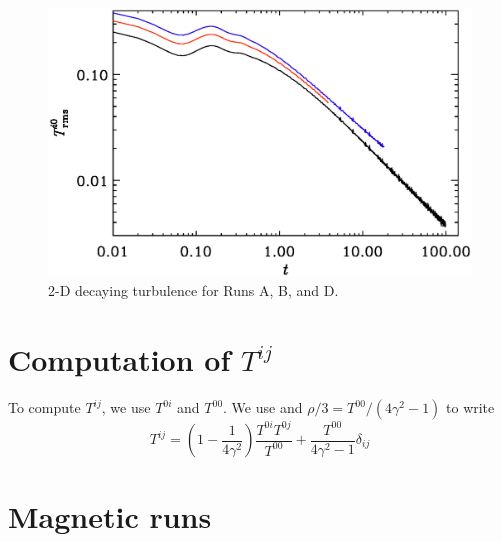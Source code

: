 \documentclass[twocolumn]{article}
\begin{document}
\begin{figure}[h!]\begin{center}
\includegraphics[width=\columnwidth]{pcomp}
\end{center}\caption[]{
2-D decaying turbulence for Runs A, B, and D.
}\label{pcomp}\end{figure}

\section{Computation of $T^{ij}$}

To compute $T^{ij}$, we use $T^{0i}$ and $T^{00}$.
We use  and $\rho/3=T^{00}/(4\gamma^2-1)$
to write
\begin{equation}
T^{ij}=\left(1-\frac{1}{4\gamma^2}\right)
\frac{T^{0i}T^{0j}}{T^{00}}
+\frac{T^{00}}{4\gamma^2-1}\delta_{ij}
\label{hydroStress2}
\end{equation}

\section{Magnetic runs}
\end{document}
